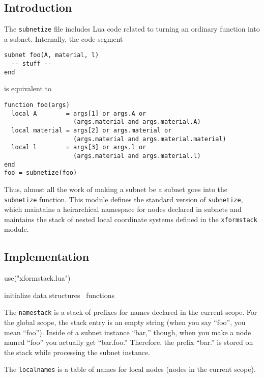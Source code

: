 \subsection{Introduction}

The {\tt{}subnetize} file includes Lua code related to turning an ordinary
function into a subnet.  Internally, the code segment
\begin{verbatim}
subnet foo(A, material, l)
  -- stuff --
end
\end{verbatim}
is equivalent to
\begin{verbatim}
function foo(args)
  local A        = args[1] or args.A or 
                   (args.material and args.material.A)
  local material = args[2] or args.material or 
                   (args.material and args.material.material)
  local l        = args[3] or args.l or 
                   (args.material and args.material.l)
end
foo = subnetize(foo)
\end{verbatim}

Thus, almost all the work of making a subnet be a subnet goes
into the {\tt{}subnetize} function.  This module defines the
standard version of {\tt{}subnetize}, which maintains a heirarchical
namespace for nodes declared in subnets and maintains the stack
of nested local coordinate systems defined in the {\tt{}xformstack}
module.


\subsection{Implementation}

\endmoddef
use("xformstack.lua")

\LA{}initialize data structures~{\nwtagstyle{}}\RA{}
\LA{}functions~{\nwtagstyle{}}\RA{}
\nwendcode{}\nwdocspar

The {\tt{}namestack} is a stack of prefixes for names declared in the
current scope.  For the global scope, the stack entry is an empty
string (when you say ``foo'', you mean ``foo'').  Inside of a subnet
instance ``bar,'' though, when you make a node named ``foo'' you actually
get ``bar.foo.''  Therefore, the prefix ``bar.'' is stored on the
stack while processing the subnet instance.

The {\tt{}localnames} is a table of names for local nodes (nodes in the current
scope).

